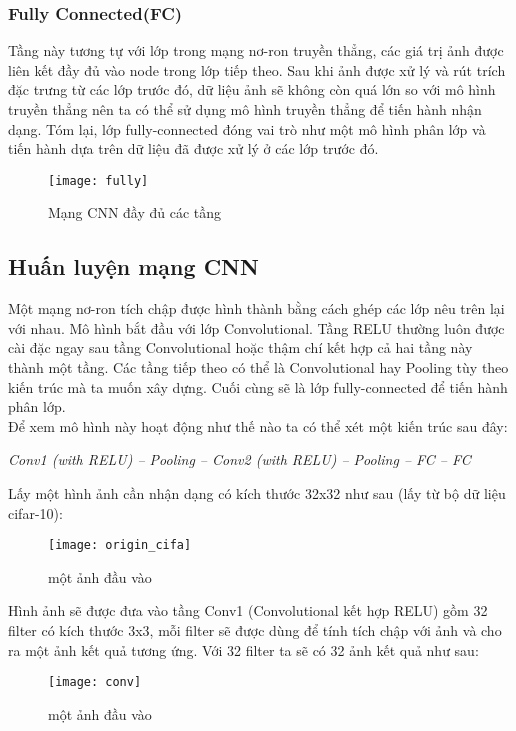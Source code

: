 \documentclass[13pt, a4paper]{extreport}
\begin{document}
\subsubsection{Fully Connected(FC)}
\indent Tầng này tương tự với lớp trong mạng nơ-ron truyền thẳng, các giá trị ảnh được liên kết đầy đủ vào node trong lớp tiếp theo. Sau khi ảnh được xử lý và rút trích đặc trưng từ các lớp trước đó, dữ liệu ảnh sẽ không còn quá lớn so với mô hình truyền thẳng nên ta có thể sử dụng mô hình truyền thẳng để tiến hành nhận dạng. Tóm lại, lớp fully-connected đóng vai trò như một mô hình phân lớp và tiến hành dựa trên dữ liệu đã được xử lý ở các lớp trước đó.
\begin{figure}[H]
  \centering
    \texttt{[image: fully]}
   \caption{\large Mạng CNN đầy đủ các tầng}
\end{figure}
\subsection{Huấn luyện mạng CNN}
\indent Một mạng nơ-ron tích chập được hình thành bằng cách ghép các lớp nêu trên lại với nhau. Mô hình bắt đầu với lớp Convolutional. Tầng RELU thường luôn được cài đặc ngay sau tầng Convolutional hoặc thậm chí kết hợp cả hai tầng này thành một tầng. Các tầng tiếp theo có thể là Convolutional hay Pooling tùy theo kiến trúc mà ta muốn xây dựng. Cuối cùng sẽ là lớp fully-connected để tiến hành phân lớp.\\
\indent Để xem mô hình này hoạt động như thế nào ta có thể xét một kiến trúc sau đây:
\begin{center}
\textit{Conv1 (with RELU) – Pooling – Conv2 (with RELU) – Pooling – FC – FC}
\end{center}
\indent Lấy một hình ảnh cần nhận dạng có kích thước 32x32 như sau (lấy từ bộ dữ liệu cifar-10):
\begin{figure}[H]
  \centering
    \texttt{[image: origin\_cifa]}
   \caption{\large một ảnh đầu vào}
\end{figure}
\indent Hình ảnh sẽ được đưa vào tầng Conv1 (Convolutional kết hợp RELU) gồm 32 filter có kích thước 3x3, mỗi filter sẽ được dùng để tính tích chập với ảnh và cho ra một ảnh kết quả tương ứng. Với 32 filter ta sẽ có 32 ảnh kết quả như sau:
\begin{figure}[H]
  \centering
    \texttt{[image: conv]}
   \caption{\large một ảnh đầu vào}
\end{figure}
\end{document}
